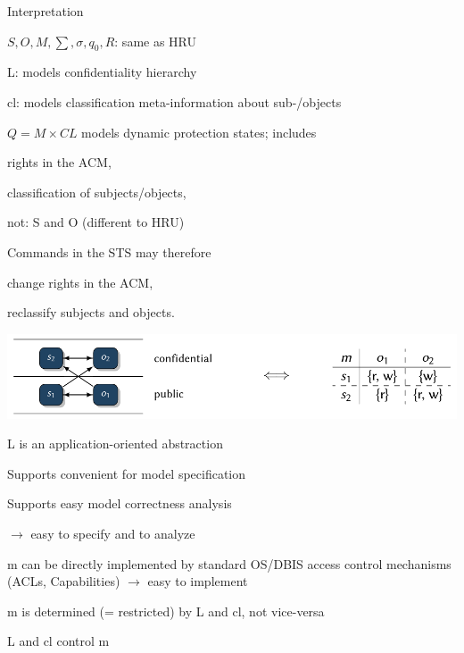 \documentclass[a4paper]{article}
\begin{document}
\begin{multicols}{3}
    Interpretation
    \begin{itemize*}
        \item $S,O,M,\sum,\sigma,q_0,R$: same as HRU
        \item L: models confidentiality hierarchy
        \item cl: models classification meta-information about sub-/objects
        \item $Q=M\times CL$ models dynamic protection states; includes
        \begin{itemize*}
            \item rights in the ACM,
            \item classification of subjects/objects,
            \item not: S and O (different to HRU)
        \end{itemize*}
        \item Commands in the STS may therefore
        \begin{itemize*}
            \item change rights in the ACM,
            \item reclassify subjects and objects.
        \end{itemize*}
    \end{itemize*}
    \includegraphics[width=\linewidth]{Assets/Systemsicherheit-lattice-vs-acm.png}

    \begin{itemize*}
        \item L is an application-oriented abstraction
        \begin{itemize*}
            \item Supports convenient for model specification
            \item Supports easy model correctness analysis
            \item[$\rightarrow$] easy to specify and to analyze
        \end{itemize*}
        \item m can be directly implemented by standard OS/DBIS access control mechanisms (ACLs, Capabilities) $\rightarrow$ easy to implement
        \item m is determined (= restricted) by L and cl, not vice-versa
        \item L and cl control m
    \end{itemize*}


\end{multicols}
\end{document}
